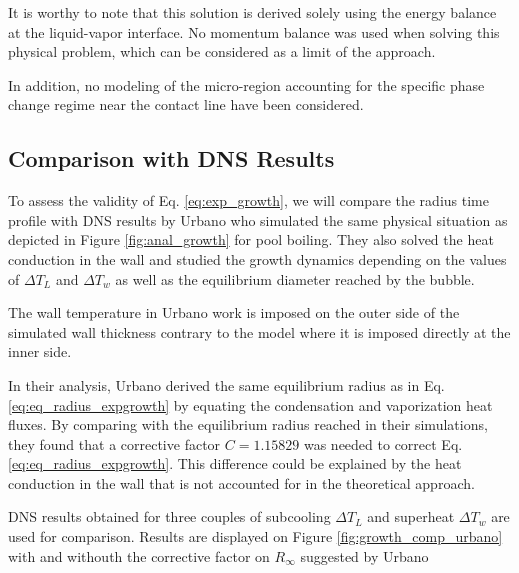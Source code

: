 \begin{remark*}{}
It is worthy to note that this solution is derived solely using the energy balance at the liquid-vapor interface. No momentum balance was used when solving this physical problem, which can be considered as a limit of the approach.

\npar

In addition, no modeling of the micro-region accounting for the specific phase change regime near the contact line have been considered.
\end{remark*}


\subsection{Comparison with DNS Results}

To assess the validity of Eq. \ref{eq:exp_growth}, we will compare the radius time profile with DNS results by Urbano \etal \cite{urbano_direct_2019} who simulated the same physical situation as depicted in Figure \ref{fig:anal_growth} for pool boiling. They also solved the heat conduction in the wall and studied the growth dynamics depending on the values of $\Delta T_{L}$ and $\Delta T_{w}$ as well as the equilibrium diameter reached by the bubble. 

\begin{note*}{}
The wall temperature in Urbano \etal work is imposed on the outer side of the simulated wall thickness contrary to the model where it is imposed directly at the inner side.
\end{note*}

\npar

In their analysis, Urbano \etal derived the same equilibrium radius as in Eq. \ref{eq:eq_radius_expgrowth} by equating the condensation and vaporization heat fluxes. By comparing with the equilibrium radius reached in their simulations, they found that a corrective factor $C=1.15829$ was needed to correct Eq. \ref{eq:eq_radius_expgrowth}. This difference could be explained by the heat conduction in the wall that is not accounted for in the theoretical approach.

\npar

DNS results obtained for three couples of subcooling $\Delta T_{L}$ and superheat $\Delta T_{w}$ are used for comparison. Results are displayed on Figure \ref{fig:growth_comp_urbano} with and withouth the corrective factor on $R_{\infty}$ suggested by Urbano \etal

